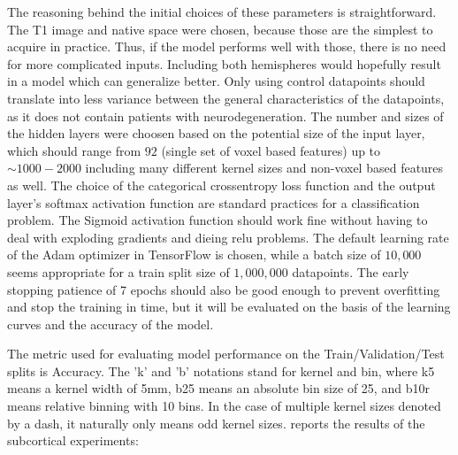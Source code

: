 The reasoning behind the initial choices of these parameters is straightforward. The T1 image and native space were chosen, because those are the simplest to acquire in practice. Thus, if the model performs well with those, there is no need for more complicated inputs. Including both hemispheres would hopefully result in a model which can generalize better. Only using control datapoints should translate into less variance between the general characteristics of the datapoints, as it does not contain patients with neurodegeneration. The number and sizes of the hidden layers were choosen based on the potential size of the input layer, which should range from $92$ (single set of voxel based features) up to $\sim1000-2000$ including many different kernel sizes and non-voxel based features as well. The choice of the categorical crossentropy loss function and the output layer's softmax activation function are standard practices for a classification problem. The Sigmoid activation function should work fine without having to deal with exploding gradients and dieing relu problems. The default learning rate of the Adam optimizer in TensorFlow is chosen, while a batch size of $10,000$ seems appropriate for a train split size of $1,000,000$ datapoints. The early stopping patience of 7 epochs should also be good enough to prevent overfitting and stop the training in time, but it will be evaluated on the basis of the learning curves and the accuracy of the model.\par
The metric used for evaluating model performance on the Train/Validation/Test splits is Accuracy. The 'k' and 'b' notations stand for kernel and bin, where k5 means a kernel width of 5mm, b25 means an absolute bin size of 25, and b10r means relative binning with 10 bins. In the case of multiple kernel sizes denoted by a dash, it naturally only means odd kernel sizes.  reports the results of the subcortical experiments:

